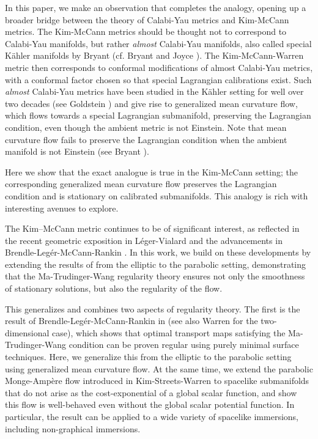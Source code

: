 \documentclass[12pt,letterpaper]{amsart}%
\numberwithin{mycounter}{section}
\theoremstyle{plain}
\numberwithin{equation}{section}
\theoremstyle{definition}
\newcommand{\note}[1]{\strut{\color{red}[#1]}}
\begin{document}
In this paper, we make an observation that completes the analogy, opening up a broader bridge between the theory of Calabi-Yau metrics and Kim-McCann metrics.  The Kim-McCann metrics should be thought not to correspond to Calabi-Yau manifolds, but rather \textit{almost} Calabi-Yau manifolds, also called special K\"ahler manifolds by  Bryant (cf. Bryant \cite{bryant2000second} and Joyce \cite[pg 43]{joyce2001lectures}). The Kim-McCann-Warren metric then corresponds to conformal modifications of almost Calabi-Yau metrics, with a conformal factor chosen so that special Lagrangian calibrations exist. Such \textit{almost} Calabi-Yau metrics have been studied in the K\"ahler setting for well over two decades (see Goldstein \cite{Gold}) and give rise to generalized mean curvature flow, which flows towards a special Lagrangian submanifold, preserving the Lagrangian condition, even though the ambient metric is not Einstein. Note that mean curvature flow fails to preserve the Lagrangian condition when the ambient manifold is not Einstein (see Bryant \cite{Bryant}).

Here we show that the exact analogue is true in the Kim-McCann setting; the corresponding generalized mean curvature flow preserves the Lagrangian condition and is stationary on calibrated submanifolds.  This analogy is rich with interesting avenues to explore. 




The Kim–McCann metric continues to be of significant interest, as reflected in the recent geometric exposition in L\'eger-Vialard \cite{LV} and the advancements in Brendle-Leg\'er-McCann-Rankin \cite{BLMR}. In this work, we build on these developments by extending the results of \cite{BLMR} from the elliptic to the parabolic setting, demonstrating that the Ma-Trudinger-Wang \cite{MTW} regularity theory ensures not only the smoothness of stationary solutions, but also the regularity of the flow.

This generalizes and combines two aspects of regularity theory. 
The first is the result of Brendle-Leg\'er-McCann-Rankin in \cite{BLMR} (see also Warren \cite{W2025} for the two-dimensional case), which shows that optimal transport maps satisfying the Ma-Trudinger-Wang condition can be proven regular using purely minimal surface techniques. Here, we generalize this from the elliptic to the parabolic setting using generalized mean curvature flow.  At the same time, we extend the parabolic Monge-Amp\`ere flow introduced in Kim-Streets-Warren \cite{KSW} to spacelike submanifolds that do not arise as the cost-exponential of a global scalar function, and show this flow is well-behaved even without the global scalar potential function.  In particular, the result can be applied to a wide variety of spacelike immersions, including non-graphical immersions.   
\end{document}
